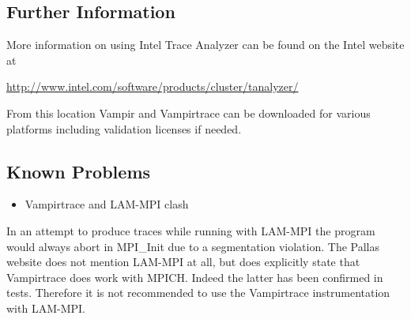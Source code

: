 \subsection{Further Information }

More information on using Intel Trace Analyzer can be found on the
Intel website at

\href{http://www.intel.com/software/products/cluster/tanalyzer/}{http://www.intel.com/software/products/cluster/tanalyzer/}

From this location Vampir and Vampirtrace can be downloaded for various
platforms including validation licenses if needed.


\subsection{Known Problems}
\begin{itemize}
\item Vampirtrace and LAM-MPI clash
\end{itemize}
In an attempt to produce traces while running with LAM-MPI the program
would always abort in MPI\_Init due to a segmentation violation. The
Pallas website does not mention LAM-MPI at all, but does explicitly
state that Vampirtrace does work with MPICH. Indeed the latter has
been confirmed in tests. Therefore it is not recommended to use the
Vampirtrace instrumentation with LAM-MPI. 
